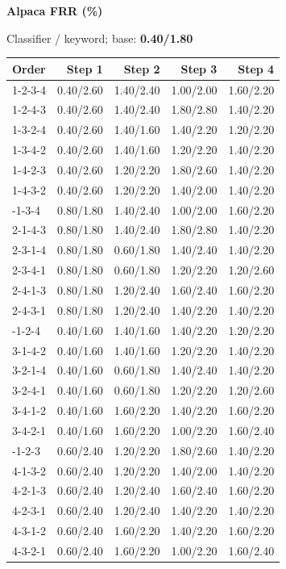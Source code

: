 \hfill
\begin{minipage}[t]{0.325\linewidth}
\centering
{\bfseries Alpaca FRR (\%)}\par
{\small Classifier / keyword; base: \textbf{0.40/1.80}}\par\vspace{5pt}
\small\setlength{\tabcolsep}{3.5pt}\renewcommand{\arraystretch}{1.19}
\begin{tabular}{@{}lrrrr@{}}
\toprule Order & Step 1 & Step 2 & Step 3 & Step 4 \\
\midrule
1-2-3-4 & 0.40/2.60 & 1.40/2.40 & 1.00/2.00 & 1.60/2.20 \\
1-2-4-3 & 0.40/2.60 & 1.40/2.40 & 1.80/2.80 & 1.40/2.20 \\
1-3-2-4 & 0.40/2.60 & 1.40/1.60 & 1.40/2.20 & 1.20/2.20 \\
1-3-4-2 & 0.40/2.60 & 1.40/1.60 & 1.20/2.20 & 1.40/2.20 \\
1-4-2-3 & 0.40/2.60 & 1.20/2.20 & 1.80/2.60 & 1.40/2.20 \\
1-4-3-2 & 0.40/2.60 & 1.20/2.20 & 1.40/2.00 & 1.40/2.20 \\
\addlinespace[3pt]
2-1-3-4 & 0.80/1.80 & 1.40/2.40 & 1.00/2.00 & 1.60/2.20 \\
2-1-4-3 & 0.80/1.80 & 1.40/2.40 & 1.80/2.80 & 1.40/2.20 \\
2-3-1-4 & 0.80/1.80 & 0.60/1.80 & 1.40/2.40 & 1.40/2.20 \\
2-3-4-1 & 0.80/1.80 & 0.60/1.80 & 1.20/2.20 & 1.20/2.60 \\
2-4-1-3 & 0.80/1.80 & 1.20/2.40 & 1.60/2.40 & 1.60/2.20 \\
2-4-3-1 & 0.80/1.80 & 1.20/2.40 & 1.40/2.20 & 1.40/2.20 \\
\addlinespace[3pt]
3-1-2-4 & 0.40/1.60 & 1.40/1.60 & 1.40/2.20 & 1.20/2.20 \\
3-1-4-2 & 0.40/1.60 & 1.40/1.60 & 1.20/2.20 & 1.40/2.20 \\
3-2-1-4 & 0.40/1.60 & 0.60/1.80 & 1.40/2.40 & 1.40/2.20 \\
3-2-4-1 & 0.40/1.60 & 0.60/1.80 & 1.20/2.20 & 1.20/2.60 \\
3-4-1-2 & 0.40/1.60 & 1.60/2.20 & 1.40/2.20 & 1.60/2.20 \\
3-4-2-1 & 0.40/1.60 & 1.60/2.20 & 1.00/2.20 & 1.60/2.40 \\
\addlinespace[3pt]
4-1-2-3 & 0.60/2.40 & 1.20/2.20 & 1.80/2.60 & 1.40/2.20 \\
4-1-3-2 & 0.60/2.40 & 1.20/2.20 & 1.40/2.00 & 1.40/2.20 \\
4-2-1-3 & 0.60/2.40 & 1.20/2.40 & 1.60/2.40 & 1.60/2.20 \\
4-2-3-1 & 0.60/2.40 & 1.20/2.40 & 1.40/2.20 & 1.40/2.20 \\
4-3-1-2 & 0.60/2.40 & 1.60/2.20 & 1.40/2.20 & 1.60/2.20 \\
4-3-2-1 & 0.60/2.40 & 1.60/2.20 & 1.00/2.20 & 1.60/2.40 \\
\bottomrule
\end{tabular}
\end{minipage}
